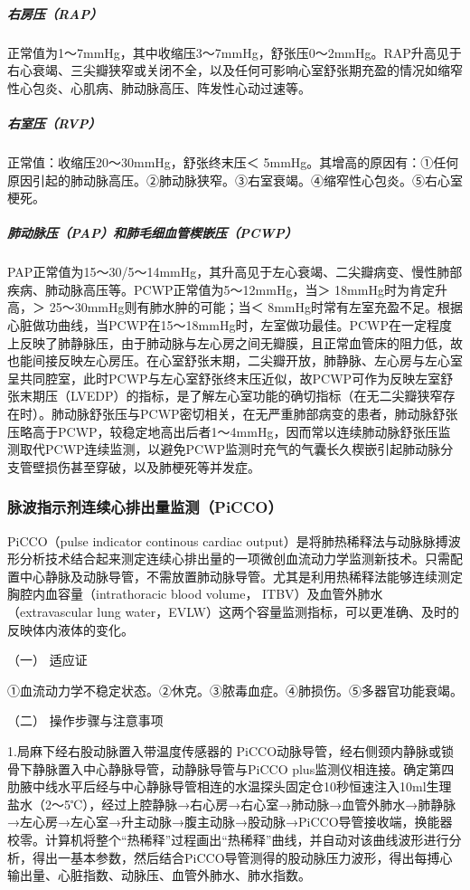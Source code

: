 \subparagraph{右房压（RAP）}

正常值为1～7mmHg，其中收缩压3～7mmHg，舒张压0～2mmHg。RAP升高见于右心衰竭、三尖瓣狭窄或关闭不全，以及任何可影响心室舒张期充盈的情况如缩窄性心包炎、心肌病、肺动脉高压、阵发性心动过速等。

\subparagraph{右室压（RVP）}

正常值：收缩压20～30mmHg，舒张终末压＜
5mmHg。其增高的原因有：①任何原因引起的肺动脉高压。②肺动脉狭窄。③右室衰竭。④缩窄性心包炎。⑤右心室梗死。

\subparagraph{肺动脉压（PAP）和肺毛细血管楔嵌压（PCWP）}

PAP正常值为15～30/5～14mmHg，其升高见于左心衰竭、二尖瓣病变、慢性肺部疾病、肺动脉高压等。PCWP正常值为5～12mmHg，当＞
18mmHg时为肯定升高，＞ 25～30mmHg则有肺水肿的可能；当＜
8mmHg时常有左室充盈不足。根据心脏做功曲线，当PCWP在15～18mmHg时，左室做功最佳。PCWP在一定程度上反映了肺静脉压，由于肺动脉与左心房之间无瓣膜，且正常血管床的阻力低，故也能间接反映左心房压。在心室舒张末期，二尖瓣开放，肺静脉、左心房与左心室呈共同腔室，此时PCWP与左心室舒张终末压近似，故PCWP可作为反映左室舒张末期压（LVEDP）的指标，是了解左心室功能的确切指标（在无二尖瓣狭窄存在时）。肺动脉舒张压与PCWP密切相关，在无严重肺部病变的患者，肺动脉舒张压略高于PCWP，较稳定地高出后者1～4mmHg，因而常以连续肺动脉舒张压监测取代PCWP连续监测，以避免PCWP监测时充气的气囊长久楔嵌引起肺动脉分支管壁损伤甚至穿破，以及肺梗死等并发症。

\subsubsection{脉波指示剂连续心排出量监测（PiCCO）}

PiCCO（pulse indicator continous cardiac
output）是将肺热稀释法与动脉脉搏波形分析技术结合起来测定连续心排出量的一项微创血流动力学监测新技术。只需配置中心静脉及动脉导管，不需放置肺动脉导管。尤其是利用热稀释法能够连续测定胸腔内血容量（intrathoracic
blood volume， ITBV）及血管外肺水（extravascular lung
water，EVLW）这两个容量监测指标，可以更准确、及时的反映体内液体的变化。

\hypertarget{text00376.htmlux5cux23CHP16-6-6-1}{}
（一） 适应证

①血流动力学不稳定状态。②休克。③脓毒血症。④肺损伤。⑤多器官功能衰竭。

\hypertarget{text00376.htmlux5cux23CHP16-6-6-2}{}
（二） 操作步骤与注意事项

1.局麻下经右股动脉置入带温度传感器的
PiCCO动脉导管，经右侧颈内静脉或锁骨下静脉置入中心静脉导管，动静脉导管与PiCCO
plus监测仪相连接。确定第四肋腋中线水平后经与中心静脉导管相连的水温探头固定仓10秒恒速注入10ml生理盐水（2～5℃），经过上腔静脉→右心房→右心室→肺动脉→血管外肺水→肺静脉→左心房→左心室→升主动脉→腹主动脉→股动脉→PiCCO导管接收端，换能器校零。计算机将整个“热稀释”过程画出“热稀释”曲线，并自动对该曲线波形进行分析，得出一基本参数，然后结合PiCCO导管测得的股动脉压力波形，得出每搏心输出量、心脏指数、动脉压、血管外肺水、肺水指数。

